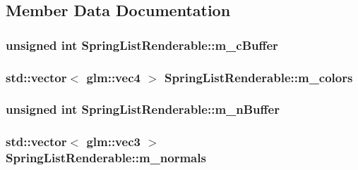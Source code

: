 \subsection{Member Data Documentation}
\hypertarget{classSpringListRenderable_a5f7e5d08fc94377d2dec95d0cc78cfe9}{
\subsubsection[{m\+\_\+c\+Buffer}]{\setlength{\rightskip}{0pt plus 5cm}unsigned int Spring\+List\+Renderable\+::m\+\_\+c\+Buffer\hspace{0.3cm}{\ttfamily [private]}}}\label{classSpringListRenderable_a5f7e5d08fc94377d2dec95d0cc78cfe9}
\hypertarget{classSpringListRenderable_ad040942c462bc6f263ed2fa179fc7567}{
\subsubsection[{m\+\_\+colors}]{\setlength{\rightskip}{0pt plus 5cm}std\+::vector$<$ glm\+::vec4 $>$ Spring\+List\+Renderable\+::m\+\_\+colors\hspace{0.3cm}{\ttfamily [private]}}}\label{classSpringListRenderable_ad040942c462bc6f263ed2fa179fc7567}
\hypertarget{classSpringListRenderable_a4159b0ea8821a34e3be6a0a338d95a3b}{
\subsubsection[{m\+\_\+n\+Buffer}]{\setlength{\rightskip}{0pt plus 5cm}unsigned int Spring\+List\+Renderable\+::m\+\_\+n\+Buffer\hspace{0.3cm}{\ttfamily [private]}}}\label{classSpringListRenderable_a4159b0ea8821a34e3be6a0a338d95a3b}
\hypertarget{classSpringListRenderable_a63491699391194b90b3d2b4863cccf2e}{
\subsubsection[{m\+\_\+normals}]{\setlength{\rightskip}{0pt plus 5cm}std\+::vector$<$ glm\+::vec3 $>$ Spring\+List\+Renderable\+::m\+\_\+normals\hspace{0.3cm}{\ttfamily [private]}}}\label{classSpringListRenderable_a63491699391194b90b3d2b4863cccf2e}
